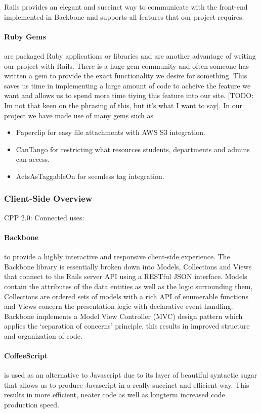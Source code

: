 		Rails provides an elegant and succinct way to communicate with the front-end implemented in Backbone and supports all features that our project requires. 

		\paragraph{Ruby Gems\cite{gems}} are packaged Ruby applications or libraries and are another advantage of writing our project with Rails. There is a huge gem community and often someone has written a gem to provide the exact functionality we desire for something. This saves us time in implementing a large amount of code to acheive the feature we want and allows us to spend more time tiying this feature into our site. [TODO: Im not that keen on the phrasing of this, but it's what I want to say]. In our project we have made use of many gems such as
		\begin{itemize}
		 \item Paperclip\cite{paperclip} for easy file attachments with AWS S3\cite{s3} integration.
		 \item CanTango\cite{cantango} for restricting what resources students, departments and admins can access.
		 \item ActsAsTaggableOn\cite{tags} for seemless tag integration.
		\end{itemize}
	\subsubsection{Client-Side Overview}
		CPP 2.0: Connected uses:
		\paragraph{Backbone\cite{backbone}} to provide a highly interactive and responsive client-side experience. The Backbone library is essentially broken down into Models, Collections and Views that connect to the Rails server API using a RESTful JSON interface. Models contain the attributes of the data entities as well as the logic surrounding them, Collections are ordered sets of models with a rich API of enumerable functions and Views concern the presentation logic with declarative event handling. Backbone implements a Model View Controller (MVC) design pattern which applies the `separation of  concerns' principle, this results in improved structure and organization of code.
		\paragraph{CoffeeScript\cite{coffeescript}} is used as an alternative to Javascript due to its layer of beautiful syntactic sugar that allows us to produce Javascript in a really succinct and efficient way. This results in more efficient, neater code as well as longterm increased code production speed.
